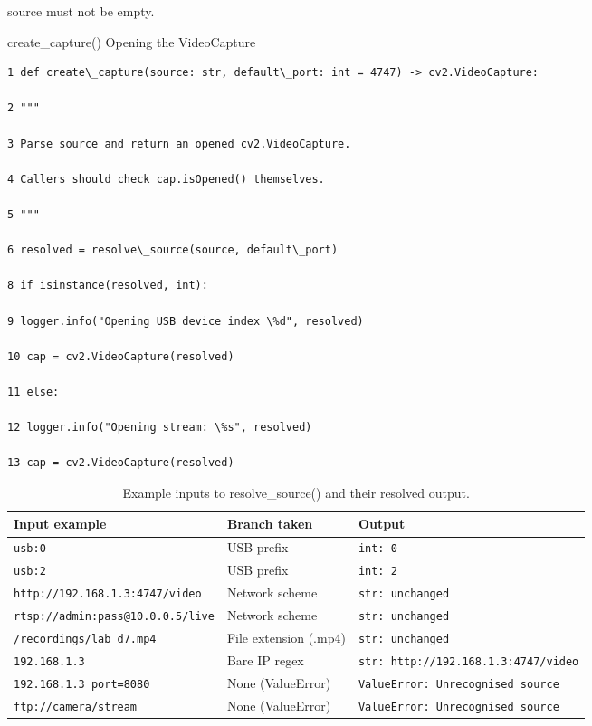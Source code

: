 source must not be empty.

create\_capture()  Opening the VideoCapture

\begin{listingbox}
	\begin{verbatim}
1 def create\_capture(source: str, default\_port: int = 4747) -> cv2.VideoCapture:

2 """

3 Parse source and return an opened cv2.VideoCapture.

4 Callers should check cap.isOpened() themselves.

5 """

6 resolved = resolve\_source(source, default\_port)

8 if isinstance(resolved, int):

9 logger.info("Opening USB device index \%d", resolved)

10 cap = cv2.VideoCapture(resolved)

11 else:

12 logger.info("Opening stream: \%s", resolved)

13 cap = cv2.VideoCapture(resolved)

\end{verbatim}
\end{listingbox}
\begin{table}[htbp]
	\centering
	\caption{Example inputs to resolve\_source() and their resolved output.}
	\label{tab:5-3}
	\begin{tabular}{lll}
		\toprule
		Input example                            & Branch taken          & Output                                      \\
		\midrule
		\texttt{usb:0}                           & USB prefix            & \texttt{int: 0}                             \\
		\texttt{usb:2}                           & USB prefix            & \texttt{int: 2}                             \\
		\texttt{http://192.168.1.3:4747/video}   & Network scheme        & \texttt{str: unchanged}                     \\
		\texttt{rtsp://admin:pass@10.0.0.5/live} & Network scheme        & \texttt{str: unchanged}                     \\
		\texttt{/recordings/lab\_d7.mp4}         & File extension (.mp4) & \texttt{str: unchanged}                     \\
		\texttt{192.168.1.3}                     & Bare IP regex         & \texttt{str: http://192.168.1.3:4747/video} \\
		\texttt{192.168.1.3 port=8080}           & None (ValueError)     & \texttt{ValueError: Unrecognised source}    \\
		\texttt{ftp://camera/stream}             & None (ValueError)     & \texttt{ValueError: Unrecognised source}    \\
		\bottomrule
	\end{tabular}
\end{table}

